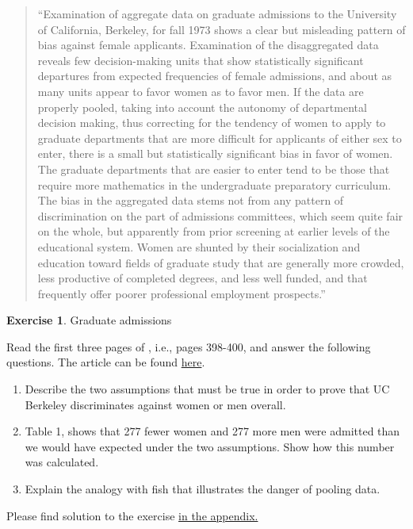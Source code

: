 \documentclass[
  12pt,
  oneside]{book}
\providecommand{\tightlist}{%
  \setlength{\itemsep}{0pt}\setlength{\parskip}{0pt}}
\theoremstyle{definition}
\theoremstyle{definition}
\theoremstyle{definition}
\newtheorem{exercise}{Exercise}[chapter]
\theoremstyle{definition}
\theoremstyle{remark}
\begin{document}
\begin{quote}
``Examination of aggregate data on graduate admissions to the University of California, Berkeley, for fall 1973 shows a clear but misleading pattern of bias against female applicants. Examination of the disaggregated data reveals few decision-making units that show statistically significant departures from expected frequencies of female admissions, and about as many units appear to favor women as to favor men. If the data are properly pooled, taking into account the autonomy of departmental decision making, thus correcting for the tendency of women to apply to graduate departments that are more difficult for applicants of either sex to enter, there is a small but statistically significant bias in favor of women. The graduate departments that are easier to enter tend to be those that require more mathematics in the undergraduate preparatory curriculum. The bias in the aggregated data stems not from any pattern of discrimination on the part of admissions committees, which seem quite fair on the whole, but apparently from prior screening at earlier levels of the educational system. Women are shunted by their socialization and education toward fields of graduate study that are generally more crowded, less productive of completed degrees, and less well funded, and that frequently offer poorer professional employment prospects.''
\end{quote}

\begin{exercise}
\protect\hypertarget{exr:graduateadmission}{}\label{exr:graduateadmission}Graduate admissions

Read the first three pages of \citet{Bickel1975Sex}, i.e., pages 398-400, and answer the following questions. The article can be found \href{https://www.science.org/doi/pdf/10.1126/science.187.4175.398}{here}.

\begin{enumerate}
\def\labelenumi{\alph{enumi})}
\tightlist
\item
  Describe the two assumptions that must be true in order to prove that UC Berkeley discriminates against women or men overall.
\item
  Table 1, shows that 277 fewer women and 277 more men were admitted than we would have expected under the two assumptions. Show how this number was calculated.
\item
  Explain the analogy with fish that illustrates the danger of pooling data.
\end{enumerate}

Please find solution to the exercise \protect\hyperlink{sol:graduateadmission}{in the appendix.}
\end{exercise}
\end{document}
